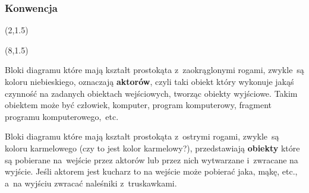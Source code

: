 \documentclass[10pt,t]{beamer}
\begin{document}
\begin{frame}
  \frametitle{Konwencja}


  \begin{textblock}{2.8}(2,1.5)


  \end{textblock}



  \begin{textblock}{2.8}(8,1.5)


  \end{textblock}


  \vspace{6em}





  Bloki diagramu które mają kształt prostokąta z~zaokrąglonymi rogami,
  zwykle~są koloru niebieskiego, oznaczają \textbf{aktorów}, czyli
  taki obiekt który wykonuje jakąś czynność na zadanych obiektach
  wejściowych, tworząc obiekty wyjściowe. Takim obiektem może być człowiek,
  komputer, program komputerowy, fragment programu komputerowego,~etc.

  Bloki diagramu które mają kształt prostokąta z~ostrymi rogami, zwykle~są
  koloru karmelowego (czy to jest kolor karmelowy?), przedstawiają
  \textbf{obiekty} które są pobierane na~wejście przez aktorów lub przez
  nich wytwarzane i~zwracane na wyjście. Jeśli aktorem jest kucharz to na
  wejście może pobierać jaka, mąkę, etc., a~na wyjściu zwracać naleśniki
  z~truskawkami.

\end{frame}
\end{document}
